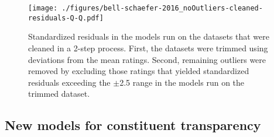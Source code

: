 \begin{figure}[p]
  \centering
\texttt{[image: ./figures/bell-schaefer-2016\_noOutliers-cleaned-residuals-Q-Q.pdf]}
  \caption{Standardized residuals in the models run on the datasets that were cleaned in a 2-step process. First, the datasets were
    trimmed using deviations from the mean ratings. Second, remaining outliers were removed by excluding those ratings that yielded standardized residuals
exceeding the $\pm$2.5 range in the models run on the trimmed dataset.}
\label{fig:bellschaefer2016_clean_models_noOutliers_residuals}
\end{figure}
\pagebreak[4]
\subsection{New models for constituent transparency }
\label{sec:new-constituent-transparency}

